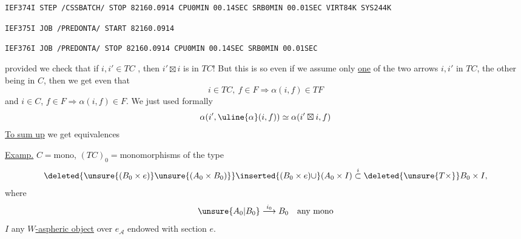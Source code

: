 \texttt{IEF374I STEP /CSSBATCH/ STOP 82160.0914 CPU\quad 0MIN 00.14SEC SRB\quad 0MIN 00.01SEC VIRT\quad 84K SYS\quad 244K}

\texttt{IEF375I JOB /PREDONTA/ START 82160.0914}

\texttt{IEF376I JOB /PREDONTA/ STOP 82160.0914 CPU\quad 0MIN 00.14SEC SRB\quad 0MIN 00.01SEC}

provided we check that if $i,i'\in TC$ , then $i'\boxtimes i$ is in $TC$! 
But  this is so even if we assume only \uline{one} of the two arrows $i,i'$ in $TC$, the other being in $C$, then we get even that
\[
i\in TC,\ f\in F\Longrightarrow\alpha(i,f)\in TF
\]
and $i\in C$, $f\in F\Rightarrow\alpha(i,f)\in F$.
We just used formally
\[
\alpha(i',\uline{\alpha}(i,f))\simeq\alpha(i'\boxtimes i,f)
\]
\uline{To sum up} we get equivalences

\uline{Examp.} 
 $C={}$mono, $(TC)_0={}$monomorphisms of the type
\[
\deleted{\unsure{(B_0\times e)}\unsure{(A_0\times B_0)}}\inserted{(B_0\times e)\cup}(A_0\times I)\overset{i}{\subset}\deleted{\unsure{T\times}}B_0\times I,
\]
where
\[
\unsure{A_0|B_0}\overset{i_0}{\longrightarrow}B_0\quad\text{any mono}
\]
$I$ any \uline{$W$-aspheric object} over $e_{\mathcal A}$ endowed with section $e$.

